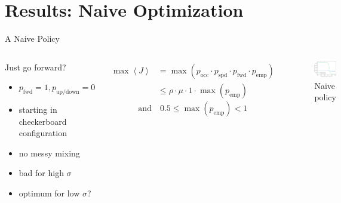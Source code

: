 \documentclass[10pt,xcolor=table, aspectratio=1610]{beamer}
\begin{document}
\section[Naive Policy]{Results: Naive Optimization}
\begin{frame}{A Naive Policy}
  \begin{columns}
    \begin{block}{Just go forward?}
      \begin{itemize}
        \item $p_\text{fwd} = 1, p_\text{up/down} = 0$
        \item starting in checkerboard configuration
        \item no messy mixing
        \item bad for high $\sigma$
        \item optimum for low $\sigma$?
      \end{itemize}
    \end{block}
    \begin{align*}
      \max \left\langle J \right\rangle &= \max \left( p_\text{occ} \cdot p_\text{spd} \cdot p_\text{fwd} \cdot p_\text{emp} \right) \\
      &\le \rho \cdot \mu \cdot 1 \cdot \max(p_\text{emp}) 
    \end{align*}
    \begin{equation*}
     \text{and}\quad 0.5 \le \max(p_\text{emp}) < 1
    \end{equation*}
    \begin{figure}
      \includegraphics[width=\textwidth]{../Thesis/img/results/steady_state_current_both_log.pdf}
      \caption*{Naive policy}
    \end{figure}
  \end{columns}
  
\end{frame}
\end{document}
